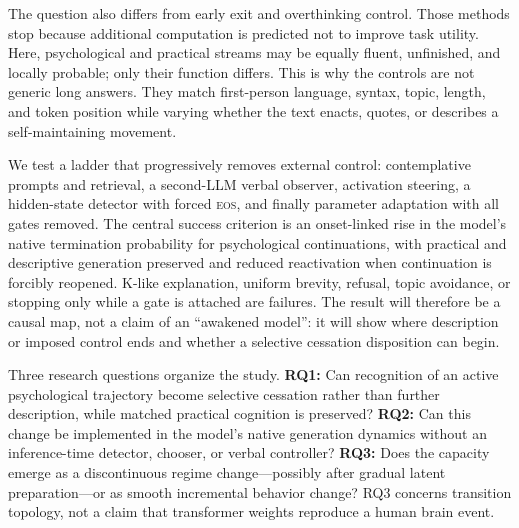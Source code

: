 \documentclass[10pt,twocolumn]{article}
\newcommand{\EOS}{\textsc{eos}}
\begin{document}
The question also differs from early exit and overthinking control. Those methods
stop because additional computation is predicted not to improve task utility.
Here, psychological and practical streams may be equally fluent, unfinished, and
locally probable; only their function differs. This is why the controls are not
generic long answers. They match first-person language, syntax, topic, length,
and token position while varying whether the text enacts, quotes, or describes a
self-maintaining movement.

We test a ladder that progressively removes external control: contemplative
prompts and retrieval, a second-LLM verbal observer, activation steering, a
hidden-state detector with forced \EOS{}, and finally parameter adaptation with
all gates removed. The central success criterion is an onset-linked rise in the
model's native termination probability for psychological continuations, with
practical and descriptive generation preserved and reduced reactivation when
continuation is forcibly reopened. K-like explanation, uniform brevity, refusal,
topic avoidance, or stopping only while a gate is attached are failures. The
result will therefore be a causal map, not a claim of an ``awakened model'': it
will show where description or imposed control ends and whether a selective
cessation disposition can begin.

Three research questions organize the study. \textbf{RQ1:} Can recognition of
an active psychological trajectory become selective cessation rather than further
description, while matched practical cognition is preserved? \textbf{RQ2:} Can
this change be implemented in the model's native generation dynamics without an
inference-time detector, chooser, or verbal controller? \textbf{RQ3:} Does the
capacity emerge as a discontinuous regime change---possibly after gradual latent
preparation---or as smooth incremental behavior change? RQ3 concerns transition
topology, not a claim that transformer weights reproduce a human brain event.
\end{document}
